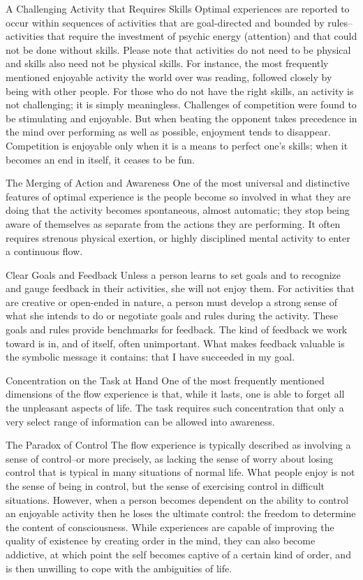 A Challenging Activity that Requires Skills
Optimal experiences are reported to occur within sequences of activities that are goal-directed and bounded by rules--activities that require the investment of psychic energy (attention) and that could not be done without skills. Please note that activities do not need to be physical and skills also need not be physical skills. For instance, the most frequently mentioned enjoyable activity the world over was reading, followed closely by being with other people. For those who do not have the right skills, an activity is not challenging; it is simply meaningless. Challenges of competition were found to be stimulating and enjoyable. But when beating the opponent takes precedence in the mind over performing as well as possible, enjoyment tends to disappear. Competition is enjoyable only when it is a means to perfect one's skills; when it becomes an end in itself, it ceases to be fun.


The Merging of Action and Awareness
One of the most universal and distinctive features of optimal experience is the people become so involved in what they are doing that the activity becomes spontaneous, almost automatic; they stop being aware of themselves as separate from the actions they are performing. It often requires strenous physical exertion, or highly disciplined mental activity to enter a continuous flow.

Clear Goals and Feedback
Unless a person learns to set goals and to recognize and gauge feedback in their activities, she will not enjoy them. For activities that are creative or open-ended in nature, a person must develop a strong sense of what she intends to do or negotiate goals and rules during the activity. These goals and rules provide benchmarks for feedback. The kind of feedback we work toward is in, and of itself, often unimportant. What makes feedback valuable is the symbolic message it contains: that I have succeeded in my goal.

Concentration on the Task at Hand
One of the most frequently mentioned dimensions of the flow experience is that, while it lasts, one is able to forget all the unpleasant aspects of life. The task requires such concentration that only a very select range of information can be allowed into awareness.

The Paradox of Control
The flow experience is typically described as involving a sense of control--or more precisely, as lacking the sense of worry about losing control that is typical in many situations of normal life. What people enjoy is not the sense of being in control, but the sense of exercising control in difficult situations. However, when a person becomes dependent on the ability to control an enjoyable activity then he loses the ultimate control: the freedom to determine the content of consciousness. While experiences are capable of improving the quality of existence by creating order in the mind, they can also become addictive, at which point the self becomes captive of a certain kind of order, and is then unwilling to cope with the ambiguities of life.

